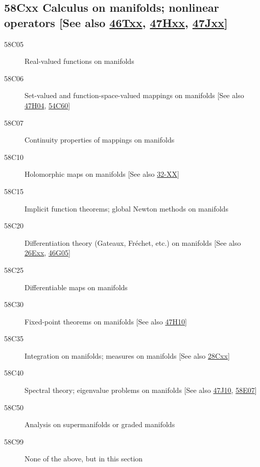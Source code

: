 \subsection*{58Cxx  Calculus on manifolds; nonlinear operators [See also \hyperref[46Txx]{46Txx}, \hyperref[47Hxx]{47Hxx}, \hyperref[47Jxx]{47Jxx}]}\label{58Cxx}
\begin{description}  
\item [58C05]\label{58C05} Real-valued functions on manifolds
\item [58C06]\label{58C06} Set-valued and function-space-valued mappings on manifolds [See also \hyperref[47H04]{47H04}, \hyperref[54C60]{54C60}]
\item [58C07]\label{58C07} Continuity properties of mappings on manifolds
\item [58C10]\label{58C10} Holomorphic maps on manifolds [See also \hyperref[32-XX]{32-XX}]
\item [58C15]\label{58C15} Implicit function theorems; global Newton methods on manifolds
\item [58C20]\label{58C20} Differentiation theory (Gateaux, Fr\'{e}chet, etc.) on manifolds [See also \hyperref[26Exx]{26Exx}, \hyperref[46G05]{46G05}]
\item [58C25]\label{58C25} Differentiable maps on manifolds
\item [58C30]\label{58C30} Fixed-point theorems on manifolds [See also \hyperref[47H10]{47H10}]
\item [58C35]\label{58C35} Integration on manifolds; measures on manifolds [See also \hyperref[28Cxx]{28Cxx}]
\item [58C40]\label{58C40} Spectral theory; eigenvalue problems  on manifolds [See also \hyperref[47J10]{47J10}, \hyperref[58E07]{58E07}]
\item [58C50]\label{58C50} Analysis on supermanifolds or graded manifolds
\item [58C99]\label{58C99} None of the above, but in this section
\end{description}
